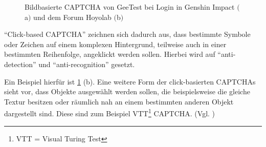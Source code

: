 \begin{figure}[h!]
    \centering
    \qquad
    \caption{Bildbasierte CAPTCHA von GeeTest bei Login in Genshin Impact $($a$)$ und dem Forum Hoyolab $($b$)$}   
    \label{fig:genshin}
\end{figure}

``Click-based CAPTCHA'' zeichnen sich dadurch aus, dass bestimmte Symbole oder Zeichen auf einem komplexen Hinter\-grund, 
teilweise auch in einer bestimmten Reihenfolge, angeklickt werden sollen.
Hierbei wird auf ``anti-detection'' und ``anti-recognition'' gesetzt. \cite[p.77]{surveyofresearch}

Ein Beispiel hierfür ist \ref{fig:genshin} (b).
Eine weitere Form der click-basierten CAPTCHAs sieht vor, dass Objekte ausgewählt werden sollen,
die beispielsweise die gleiche Textur besitzen oder räumlich nah an einem bestimmten anderen Objekt dargestellt sind. 
Diese sind zum Beispiel VTT\footnote[2]{VTT = Visual Turing Test} CAPTCHA. (Vgl. \cite[p.78]{surveyofresearch})

